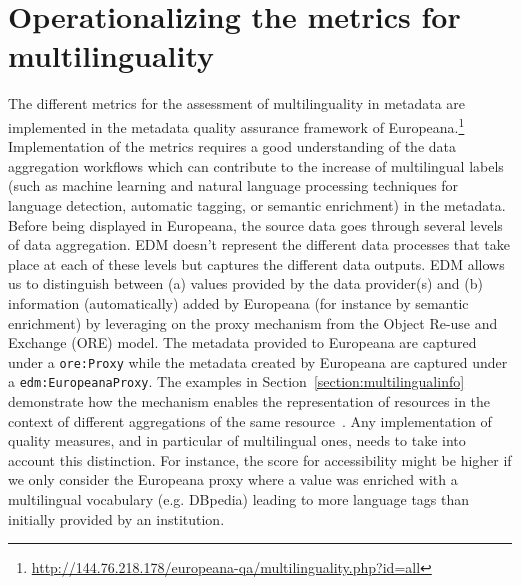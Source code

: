 \section{Operationalizing the metrics for multilinguality}
The different metrics for the assessment of multilinguality in metadata are implemented in the metadata quality assurance framework of Europeana.\footnote{ \url{http://144.76.218.178/europeana-qa/multilinguality.php?id=all}}
Implementation of the metrics requires a good understanding of the data aggregation workflows which can contribute to the increase of multilingual labels (such as machine learning and natural language processing techniques for language detection, automatic tagging, or semantic enrichment) in the metadata. Before being displayed in Europeana, the source data goes through several levels of data aggregation. EDM doesn't represent the different data processes that take place at each of these levels but captures the different data outputs. EDM allows us to distinguish between (a) values provided by the data provider(s) and (b) information (automatically) added by Europeana (for instance by semantic enrichment) by leveraging on the proxy mechanism from the Object Re-use and Exchange (ORE) model. The metadata provided to Europeana are captured under a \texttt {ore:Proxy} while the metadata created by Europeana are captured under a \texttt{edm:EuropeanaProxy}. The examples in Section~\ref{section:multilingualinfo} demonstrate how the mechanism enables the representation of resources in the context of different aggregations of the same resource~\cite{isaac2013}. Any implementation of quality measures, and in particular of multilingual ones, needs to take into account this distinction. For instance, the score for accessibility might be higher if we only consider the Europeana proxy where a value was enriched with a multilingual vocabulary (e.g. DBpedia) leading to more language tags than initially provided by an institution. 

